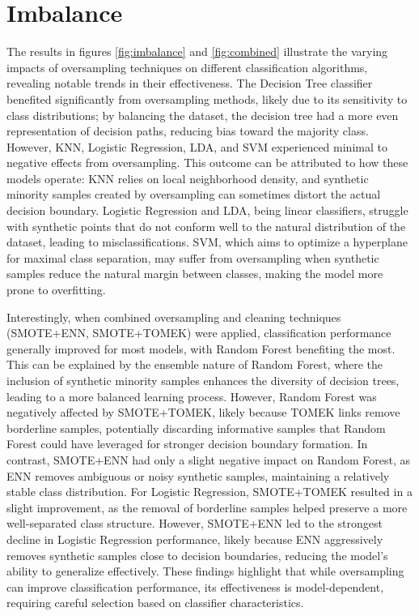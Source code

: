 \documentclass[letterpaper, notitlepage]{report}
\begin{document}
\section{Imbalance}
The results in figures \ref{fig:imbalance} and \ref{fig:combined} illustrate the varying impacts of oversampling techniques on different classification algorithms, revealing notable trends in their effectiveness. The Decision Tree classifier benefited significantly from oversampling methods, likely due to its sensitivity to class distributions; by balancing the dataset, the decision tree had a more even representation of decision paths, reducing bias toward the majority class. However, \gls{KNN}, Logistic Regression, \gls{LDA}, and \gls{SVM} experienced minimal to negative effects from oversampling. This outcome can be attributed to how these models operate: KNN relies on local neighborhood density, and synthetic minority samples created by oversampling can sometimes distort the actual decision boundary. Logistic Regression and \gls{LDA}, being linear classifiers, struggle with synthetic points that do not conform well to the natural distribution of the dataset, leading to misclassifications. SVM, which aims to optimize a hyperplane for maximal class separation, may suffer from oversampling when synthetic samples reduce the natural margin between classes, making the model more prone to overfitting.

Interestingly, when combined oversampling and cleaning techniques (SMOTE+ENN, SMOTE+TOMEK) were applied, classification performance generally improved for most models, with Random Forest benefiting the most. This can be explained by the ensemble nature of Random Forest, where the inclusion of synthetic minority samples enhances the diversity of decision trees, leading to a more balanced learning process. However, Random Forest was negatively affected by SMOTE+TOMEK, likely because TOMEK links remove borderline samples, potentially discarding informative samples that Random Forest could have leveraged for stronger decision boundary formation. In contrast, SMOTE+ENN had only a slight negative impact on Random Forest, as ENN removes ambiguous or noisy synthetic samples, maintaining a relatively stable class distribution. For Logistic Regression, SMOTE+TOMEK resulted in a slight improvement, as the removal of borderline samples helped preserve a more well-separated class structure. However, SMOTE+ENN led to the strongest decline in Logistic Regression performance, likely because ENN aggressively removes synthetic samples close to decision boundaries, reducing the model’s ability to generalize effectively. These findings highlight that while oversampling can improve classification performance, its effectiveness is model-dependent, requiring careful selection based on classifier characteristics.
\end{document}
